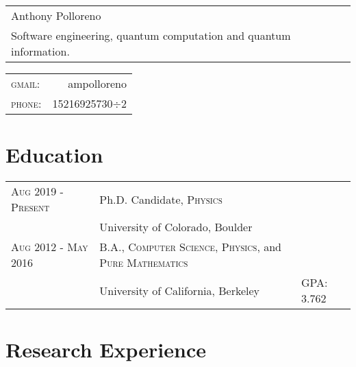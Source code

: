 \documentclass[a4paper,10pt]{article}
\begin{document}
\newcommand*{\fontin}[2]{{\setmainfont{Fontin}#1{#2}}}

\pagestyle{empty} %




\begin{tabular}{p{2.6in}}
{\Huge Anthony Polloreno}\\
Software engineering, quantum computation and quantum information.\\
\end{tabular}
\hfill
\begin{tabular}{lr}
    \fontin{\textsc}{gmail:}     & ampolloreno\\
    \fontin{\textsc}{phone:}     & 15216925730$\div$2
    \end{tabular}

\section{Education}
\begin{tabular}{l|ll}
  \fontin{\textsc}{Aug 2019 - Present} & Ph.D. Candidate, \fontin{\textsc}{Physics} \\ &University of Colorado, Boulder & \\
  \fontin{\textsc}{Aug 2012 - May 2016} & B.A., \fontin{\textsc}{Computer Science}, \fontin{\textsc}{Physics}, and \fontin{\textsc}{Pure Mathematics} \\ &University of California, Berkeley & GPA: 3.762 \\
\end{tabular}

\section{Research Experience}
\end{document}
